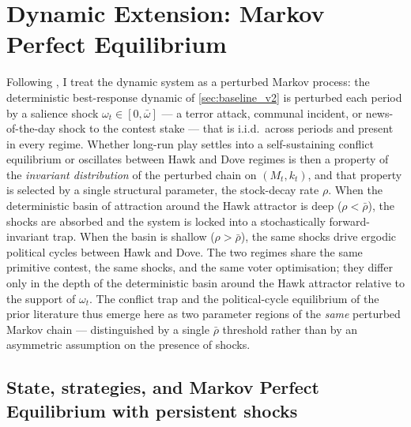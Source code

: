 \documentclass[11pt,twoside]{extarticle}
\begin{document}

\section{Dynamic Extension: Markov Perfect Equilibrium} \label{sec:dynamic_v2}

Following \citet{youngEvolutionConventions1993, youngIndividualStrategySocial2020}, I treat the dynamic system as a perturbed Markov process: the deterministic best-response dynamic of \autoref{sec:baseline_v2} is perturbed each period by a salience shock $\omega_t\in[0,\bar\omega]$ — a terror attack, communal incident, or news-of-the-day shock to the contest stake — that is i.i.d.\ across periods and present in every regime. Whether long-run play settles into a self-sustaining conflict equilibrium or oscillates between Hawk and Dove regimes is then a property of the \emph{invariant distribution} of the perturbed chain on $(M_t,k_t)$, and that property is selected by a single structural parameter, the stock-decay rate $\rho$. When the deterministic basin of attraction around the Hawk attractor is deep ($\rho<\bar\rho$), the shocks are absorbed and the system is locked into a stochastically forward-invariant trap. When the basin is shallow ($\rho>\bar\rho$), the same shocks drive ergodic political cycles between Hawk and Dove. The two regimes share the same primitive contest, the same shocks, and the same voter optimisation; they differ only in the depth of the deterministic basin around the Hawk attractor relative to the support of $\omega_t$. The conflict trap and the political-cycle equilibrium of the prior literature thus emerge here as two parameter regions of the \emph{same} perturbed Markov chain — distinguished by a single $\bar\rho$ threshold rather than by an asymmetric assumption on the presence of shocks.

\subsection{State, strategies, and Markov Perfect Equilibrium with persistent shocks}
\end{document}
